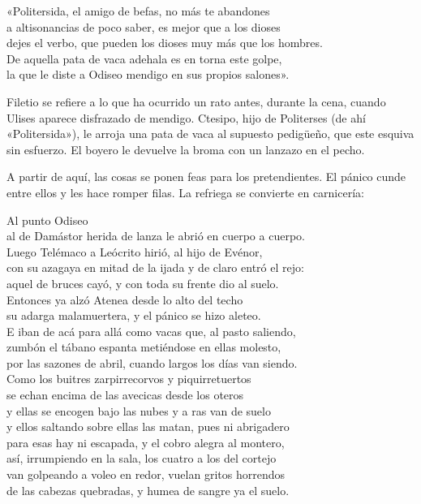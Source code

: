 \begin{versocita}
«Politersida, el amigo de befas, no más te abandones\\
a altisonancias de poco saber, es mejor que a los dioses\\
dejes el verbo, que pueden los dioses muy más que los hombres.\\
De aquella pata de vaca adehala es en torna este golpe,\\
la que le diste a Odiseo mendigo en sus propios salones».
\end{versocita}

Filetio se refiere a lo que ha ocurrido un rato antes, durante la cena, cuando Ulises aparece disfrazado de mendigo. Ctesipo, hijo de Politerses (de ahí «Politersida»), le arroja una pata de vaca al supuesto pedigüeño, que este esquiva sin esfuerzo. El boyero le devuelve la broma con un lanzazo en el pecho.

A partir de aquí, las cosas se ponen feas para los pretendientes. El pánico cunde entre ellos y les hace romper filas. La refriega se convierte en carnicería:

\begin{versocita}
[...] Al punto Odiseo\\
al de Damástor herida de lanza le abrió en cuerpo a cuerpo.\\
Luego Telémaco a Leócrito hirió, al hijo de Evénor,\\
con su azagaya en mitad de la ijada y de claro entró el rejo:\\
aquel de bruces cayó, y con toda su frente dio al suelo.\\
Entonces ya alzó Atenea desde lo alto del techo\\
su adarga malamuertera, y el pánico se hizo aleteo.\\
E iban de acá para allá como vacas que, al pasto saliendo,\\
zumbón el tábano espanta metiéndose en ellas molesto,\\
por las sazones de abril, cuando largos los días van siendo.\\
\stanzabreak
Como los buitres zarpirrecorvos y piquirretuertos\\
se echan encima de las avecicas desde los oteros\\
y ellas se encogen bajo las nubes y a ras van de suelo\\
y ellos saltando sobre ellas las matan, pues ni abrigadero\\
para esas hay ni escapada, y el cobro alegra al montero,\\
así, irrumpiendo en la sala, los cuatro a los del cortejo\\
van golpeando a voleo en redor, vuelan gritos horrendos\\
de las cabezas quebradas, y humea de sangre ya el suelo.
\end{versocita}

